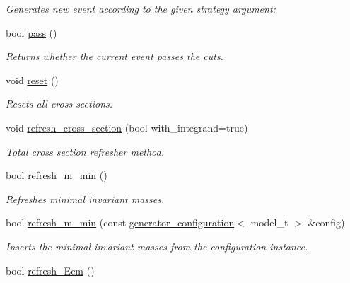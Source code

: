 \begin{DoxyCompactItemize}
\begin{DoxyCompactList}\small\item\em Generates new event according to the given strategy argument\-: \end{DoxyCompactList}\item 
\hypertarget{a00210_a0d3e8d948540d57655b7d310cb70d8ba}{bool \hyperlink{a00210_a0d3e8d948540d57655b7d310cb70d8ba}{pass} ()}\label{a00210_a0d3e8d948540d57655b7d310cb70d8ba}

\begin{DoxyCompactList}\small\item\em Returns whether the current event passes the cuts. \end{DoxyCompactList}\item 
\hypertarget{a00210_a513578e30af093a93581b3cd3667786f}{void \hyperlink{a00210_a513578e30af093a93581b3cd3667786f}{reset} ()}\label{a00210_a513578e30af093a93581b3cd3667786f}

\begin{DoxyCompactList}\small\item\em Resets all cross sections. \end{DoxyCompactList}\item 
\hypertarget{a00210_ac48b7d17637cfbaa3fde4379415621b0}{void \hyperlink{a00210_ac48b7d17637cfbaa3fde4379415621b0}{refresh\-\_\-cross\-\_\-section} (bool with\-\_\-integrand=true)}\label{a00210_ac48b7d17637cfbaa3fde4379415621b0}

\begin{DoxyCompactList}\small\item\em Total cross section refresher method. \end{DoxyCompactList}\item 
\hypertarget{a00210_a786206c05113819b08b67459225152af}{bool \hyperlink{a00210_a786206c05113819b08b67459225152af}{refresh\-\_\-m\-\_\-min} ()}\label{a00210_a786206c05113819b08b67459225152af}

\begin{DoxyCompactList}\small\item\em Refreshes minimal invariant masses. \end{DoxyCompactList}\item 
bool \hyperlink{a00210_abab5dcad611c677ee640a82a0f4020c8}{refresh\-\_\-m\-\_\-min} (const \hyperlink{a00237}{generator\-\_\-configuration}$<$ model\-\_\-t $>$ \&config)
\begin{DoxyCompactList}\small\item\em Inserts the minimal invariant masses from the configuration instance. \end{DoxyCompactList}\item 
\hypertarget{a00210_a8bf0d938af278477e00b096ece4a9af1}{bool \hyperlink{a00210_a8bf0d938af278477e00b096ece4a9af1}{refresh\-\_\-\-Ecm} ()}\label{a00210_a8bf0d938af278477e00b096ece4a9af1}


\end{DoxyCompactItemize}
